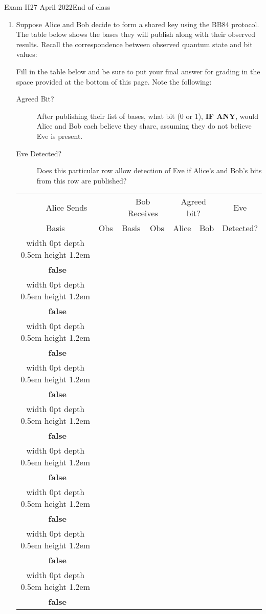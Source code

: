 \documentclass[12pt]{article}
\def\Gate#1{\mbox{\textbf{#1}}}
\def\Z{\Gate{Z}}
\def\H{\Gate{H}}
\def\Obox#1{\Ovalbox{\hbox to 1ex{\vrule width 0pt height 1ex\hss #1\hss}}}
\def\TFMarked#1#2{\ \stackbox[l][m]{\Obox{#1}~\textbf{true}\\\Obox{#2}~\textbf{false}}}
\def\TF{\TFMarked{\relax}{\relax}}
\newcommand{\Blank}[1][1in]{\mbox{\vrule width #1 depth 2pt}\vrule width 0pt height 2.0em}
\def\BlQb{\mbox{\ensuremath{\Blank[4em]\ket{0}+\Blank[4em]\ket{1}}}}
\begin{document}
\begin{assignment}{Exam II}{27 April 2022}{End of class}
\begin{enumerate}
\begin{itemize}
    \item We begin at the North pole of the Bloch sphere.
    \item We are in state \BlQb{}.
    \item We experience a \Gate{Y} gate.  We are now at \BlQb{}.
    \item We return to the North pole.
    \item We experience an \H{} gate.  We are now at \BlQb{}.
    \item We then experience a \Z{} gate.  We are now at state \BlQb{}.
    \item We finally experience an \H{} gate.  We are now at state \BlQb{}.
\end{itemize}

\clearpage\item{}  Suppose Alice and Bob decide to form a shared key using the BB84 protocol.  The table below shows the bases they will publish along with their observed results.   Recall the correspondence between observed quantum state and bit values:
\begin{BBKey}
\begin{center}
\BBBasis{}
\end{center}
\end{BBKey}
\def\RowU#1#2#3#4{%
\vrule width 0pt depth 0.5em height 1.2em#1 &#2 & #3 & #4 & & & {\vrule width 0pt depth 13pt\small\TF{}}  \\ \hline}
\def\Row#1#2#3{%
\RowU{\STD}{#1}{#2}{#3}}
\def\RowX#1#2#3{%
\RowU{\HDM}{#1}{#2}{#3}}

Fill in the table below and be sure to put your final answer for grading in the space provided at the bottom of this page.  Note the following:
\begin{description}
  \item[Agreed Bit?]  After publishing their list of bases, what bit (0 or 1), \textbf{IF ANY}, would Alice and Bob each believe they share, assuming they do not believe Eve is present.
  \item[Eve Detected?] Does this particular row allow detection of Eve if Alice's and Bob's bits from this row are published?
\end{description}

\begin{BBKey}
\begin{center}\Large
\begin{tabular}{c|c||c|c||c|c||c}
\multicolumn{2}{c||}{Alice Sends} & \multicolumn{2}{c||}{Bob Receives}& \multicolumn{2}{c||}{Agreed bit?}&Eve \\
Basis & Obs & Basis & Obs & Alice & Bob & Detected?\\\hline
\Row{\BBRt}{\STD}{\BBRt}
\Row{\BBUp}{\STD}{\BBUp}
\Row{\BBRt}{\STD}{\BBRt}
\Row{\BBUp}{\HDM}{\BBNe}
\Row{\BBRt}{\HDM}{\BBSe}
\RowX{\BBNe}{\HDM}{\BBSe}
\RowX{\BBSe}{\HDM}{\BBSe}
\RowX{\BBNe}{\HDM}{\BBNe}
\RowX{\BBNe}{\HDM}{\BBNe}


\end{tabular}
\end{center}
\end{BBKey}
\end{enumerate}
\end{assignment}
\end{document}
